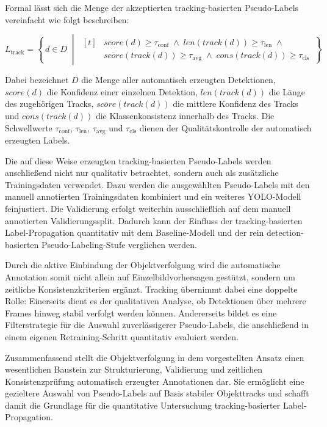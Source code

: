 Formal lässt sich die Menge der akzeptierten tracking-basierten Pseudo-Labels
vereinfacht wie folgt beschreiben:

\[
    L_{\text{track}} =
    \left\{\, d \in D \;\middle|\;
    \begin{aligned}[t]
        &score(d) \geq \tau_{\text{conf}}
        \;\land\; len(track(d)) \geq \tau_{\text{len}} \;\land{} \\
        &\overline{score}(track(d)) \geq \tau_{\text{avg}}
        \;\land\; cons(track(d)) \geq \tau_{\text{cls}}
    \end{aligned}
    \,\right\}
\]

Dabei bezeichnet \(D\) die Menge aller automatisch erzeugten Detektionen,
\(score(d)\) die Konfidenz einer einzelnen Detektion, \(len(track(d))\) die Länge
des zugehörigen Tracks, \(\overline{score}(track(d))\) die mittlere Konfidenz des
Tracks und \(cons(track(d))\) die Klassenkonsistenz innerhalb des Tracks. Die
Schwellwerte \(\tau_{\text{conf}}\), \(\tau_{\text{len}}\), \(\tau_{\text{avg}}\) und
\(\tau_{\text{cls}}\) dienen der Qualitätskontrolle der automatisch erzeugten
Labels.

Die auf diese Weise erzeugten tracking-basierten Pseudo-Labels werden anschließend
nicht nur qualitativ betrachtet, sondern auch als zusätzliche Trainingsdaten
verwendet. Dazu werden die ausgewählten Pseudo-Labels mit den manuell
annotierten Trainingsdaten kombiniert und ein weiteres YOLO-Modell
feinjustiert. Die Validierung erfolgt weiterhin ausschließlich auf dem manuell
annotierten Validierungssplit. Dadurch kann der Einfluss der tracking-basierten
Label-Propagation quantitativ mit dem Baseline-Modell und der rein
detection-basierten Pseudo-Labeling-Stufe verglichen werden.

Durch die aktive Einbindung der Objektverfolgung wird die automatische
Annotation somit nicht allein auf Einzelbildvorhersagen gestützt, sondern um
zeitliche Konsistenzkriterien ergänzt. Tracking übernimmt dabei eine doppelte
Rolle: Einerseits dient es der qualitativen Analyse, ob Detektionen über mehrere
Frames hinweg stabil verfolgt werden können. Andererseits bildet es eine
Filterstrategie für die Auswahl zuverlässigerer Pseudo-Labels, die anschließend in
einem eigenen Retraining-Schritt quantitativ evaluiert werden.

Zusammenfassend stellt die Objektverfolgung in dem vorgestellten Ansatz einen
wesentlichen Baustein zur Strukturierung, Validierung und zeitlichen
Konsistenzprüfung automatisch erzeugter Annotationen dar. Sie ermöglicht eine
gezieltere Auswahl von Pseudo-Labels auf Basis stabiler Objekttracks und schafft
damit die Grundlage für die quantitative Untersuchung tracking-basierter
Label-Propagation.


